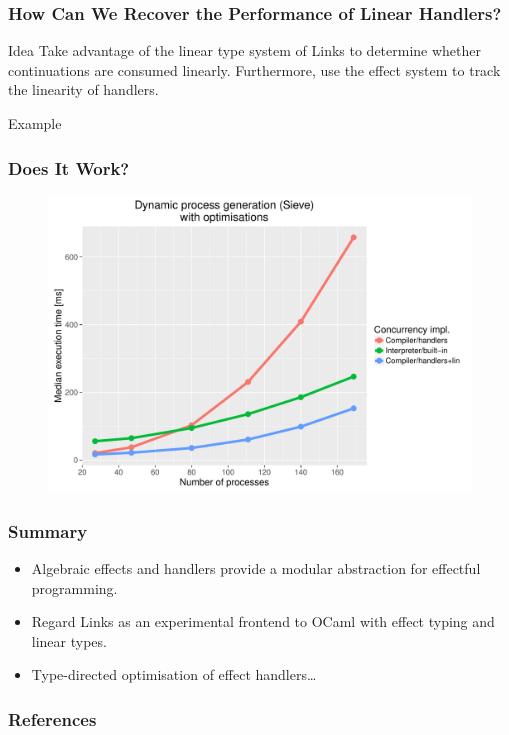 \documentclass[10pt,compress]{beamer}
\begin{document}
\begin{frame}
  \frametitle{How Can We Recover the Performance of Linear Handlers?}
  \begin{block}{Idea}
    Take advantage of the linear type system of Links to determine
    whether continuations are consumed linearly. Furthermore, use the
    effect system to track the linearity of handlers.
  \end{block}
Example
\end{frame}

\begin{frame}
  \frametitle{Does It Work?}
  \begin{figure}
    \centering
    \includegraphics[scale=0.45]{figures/sieve_recovered.pdf}
  \end{figure}
\end{frame}


\begin{frame}
  \frametitle{Summary}
\begin{itemize}
\item Algebraic effects and handlers provide a modular abstraction for
  effectful programming.
\item Regard Links as an experimental frontend to OCaml with effect
  typing and linear types.
\item Type-directed optimisation of effect handlers\dots
\end{itemize}
\end{frame}

%


\begin{frame}[allowframebreaks]
  \frametitle{References}
  \nocite{*}
  
\end{frame}
\end{document}
